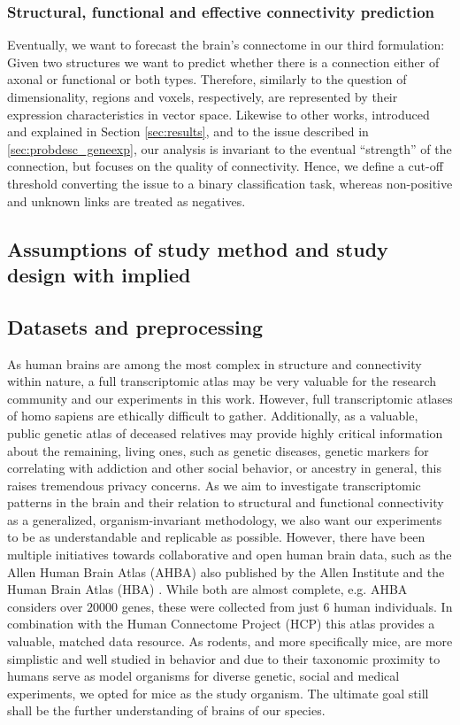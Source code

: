 \documentclass[]{article}
\renewcommand{\cite}{\citep}
\begin{document}
\subsubsection{Structural, functional and effective connectivity prediction}
\label{sec:probdesc_connpred}
Eventually, we want to forecast the brain's connectome in our third formulation: Given two structures we want to predict whether there is a connection either of axonal or functional or both types. Therefore, similarly to the question of dimensionality, regions and voxels, respectively, are represented by their expression characteristics in vector space. Likewise to other works, introduced and explained in Section \ref{sec:results}, and to the issue described in \ref{sec:probdesc_geneexp}, our analysis is invariant to the eventual ``strength'' of the connection, but focuses on the quality of connectivity. Hence, we define a cut-off threshold converting the issue to a binary classification task, whereas non-positive and unknown links are treated as negatives.


\subsection*{Assumptions of study method and study design with implied }

\subsection{Datasets and preprocessing}
\label{sec:datasets}
As human brains are among the most complex in structure and connectivity within nature, a full transcriptomic atlas may be very valuable for the research community and our experiments in this work. However, full transcriptomic atlases of homo sapiens are ethically difficult to gather. Additionally, as a valuable, public genetic atlas of deceased relatives may provide highly critical information about the remaining, living ones, such as genetic diseases, genetic markers for correlating with addiction and other social behavior, or ancestry in general, this raises tremendous privacy concerns. As we aim to investigate transcriptomic patterns in the brain and their relation to structural and functional connectivity as a generalized, organism-invariant methodology, we also want our experiments to be as understandable and replicable as possible. 
However, there have been multiple initiatives towards collaborative and open human brain data, such as the Allen Human Brain Atlas (AHBA) \cite{hawrylycz_digital_2011} also published by the Allen Institute and the Human Brain Atlas (HBA) \cite{roland1994human}. While both are almost complete, e.g. AHBA considers over $20000$ genes, these were collected from just 6 human individuals. In combination with the Human Connectome Project (HCP) \cite{van2013wu} this atlas provides a valuable, matched data resource. As rodents, and more specifically mice, are more simplistic and well studied in behavior and due to their taxonomic proximity to humans serve as model organisms for diverse genetic, social and medical experiments, we opted for mice as the study organism. The ultimate goal still shall be the further understanding of brains of our species.
\end{document}
